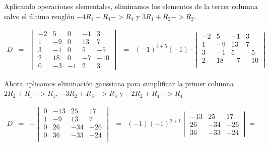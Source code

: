 \documentclass[
]{article}
\begin{document}
Aplicando operaciones elementales, eliminamos los elementos de la tercer
columna salvo el último renglón \(-4R_1 + R_4 -> R_4\) y
\(3R_1+R_2 -> R_2\).

\begin{equation*}
\begin{array}{ccccc}
D & = & \begin{vmatrix} 
              -2 & 5 & 0 & -1 & 3 \\ 
               1 & -9& 0 & 13 & 7 \\
               3 & -1& 0 & 5 & -5 \\
               2 & 18& 0 & -7&-10 \\
               0 &-3 &-1 & 2 & 3
        \end{vmatrix}
         & = & (-1)^{3+5}(-1) \cdot
        \begin{vmatrix} 
              -2 & 5  & -1 & 3 \\ 
               1 & -9 & 13 & 7 \\
               3 & -1 & 5  & -5 \\
               2 & 18 & -7 &-10 \\
        \end{vmatrix} 
\end{array}
\end{equation*}

Ahora aplicamos eliminación gaussiana para simplificar la primer columna
\(2R_2 + R_1 -> R_1\), \(-3R_2 + R_3 -> R_3\) y \(-2R_2 + R_4 -> R_4\)

\begin{equation*}
\begin{array}{ccccc}
D &= &  -\begin{vmatrix} 
               0 &-13 & 25 & 17 \\ 
               1 & -9 & 13 & 7 \\
               0 & 26 &-34 &-26 \\
               0 & 36 &-33 &-24 \\
        \end{vmatrix}
         & = & (-1)(-1)^{2+1}
        \begin{vmatrix} 
              -13 & 25 & 17  \\ 
               26 &-34 &-26  \\
               36 &-33 &-24  
        \end{vmatrix}=
\end{array}
\end{equation*}
\end{document}
